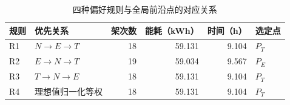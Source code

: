 \begin{table}[!htbp]
\centering
\caption{四种偏好规则与全局前沿点的对应关系}
\label{tab:q1-rules}
\small
\setlength{\tabcolsep}{4pt}
\renewcommand{\arraystretch}{1.10}
\begin{tabular}{@{}llrrrl@{}}
\toprule
规则 & 优先关系 & 架次数 & 能耗（kWh） & 时间（h） & 选定点 \\
\midrule
R1 & $N\to E\to T$ & 18 & 59.131 & 9.104 & $P_T$ \\
R2 & $E\to N\to T$ & 19 & 59.034 & 9.567 & $P_E$ \\
R3 & $T\to N\to E$ & 18 & 59.131 & 9.104 & $P_T$ \\
R4 & 理想值归一化等权 & 18 & 59.131 & 9.104 & $P_T$ \\
\bottomrule
\end{tabular}
\par{}
\end{table}
